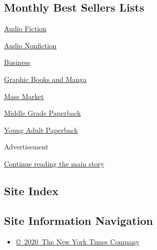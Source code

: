 \hypertarget{monthly-best-sellers-lists}{%
\subsection{Monthly Best Sellers
Lists}\label{monthly-best-sellers-lists}}

\href{/books/best-sellers/audio-fiction/}{Audio Fiction}

\href{/books/best-sellers/audio-nonfiction/}{Audio Nonfiction}

\href{/books/best-sellers/business-books/}{Business}

\href{/books/best-sellers/graphic-books-and-manga/}{Graphic Books and
Manga}

\href{/books/best-sellers/mass-market-monthly/}{Mass Market}

\href{/books/best-sellers/middle-grade-paperback-monthly/}{Middle Grade
Paperback}

\href{/books/best-sellers/young-adult-paperback-monthly/}{Young Adult
Paperback}

Advertisement

\protect\hyperlink{after-bottom}{Continue reading the main story}

\hypertarget{site-index}{%
\subsection{Site Index}\label{site-index}}

\hypertarget{site-information-navigation}{%
\subsection{Site Information
Navigation}\label{site-information-navigation}}

\begin{itemize}
\tightlist
\item
  \href{https://help.nytimes3xbfgragh.onion/hc/en-us/articles/115014792127-Copyright-notice}{©~2020~The
  New York Times Company}
\end{itemize}

